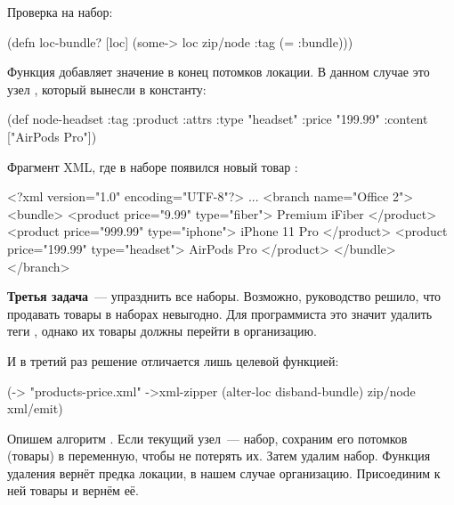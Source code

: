 Проверка на набор:

\begin{english}
  \begin{clojure}
(defn loc-bundle? [loc]
  (some-> loc zip/node :tag (= :bundle)))
  \end{clojure}
\end{english}

Функция  добавляет значение в конец потомков локации. В данном
случае это узел , который вынесли в константу:

\begin{english}
  \begin{clojure}
(def node-headset
  {:tag :product
   :attrs {:type "headset"
           :price "199.99"}
   :content ["AirPods Pro"]})
  \end{clojure}
\end{english}

Фрагмент XML, где в наборе появился новый товар :

\begin{english}
  \begin{xml/lines}
<?xml version="1.0" encoding="UTF-8"?>
...
  <branch name="Office 2">
    <bundle>
      <product price="9.99" type="fiber">
        Premium iFiber
      </product>
      <product price="999.99" type="iphone">
        iPhone 11 Pro
      </product>
      <product price="199.99" type="headset">
        AirPods Pro
      </product>
    </bundle>
  </branch>
  \end{xml/lines}
\end{english}

\textbf{Третья задача}~--- упразднить все наборы. Возможно, руководство решило,
что продавать товары в наборах невыгодно. Для программиста это значит удалить
теги , однако их товары должны перейти в организацию.

И в третий раз решение отличается лишь целевой функцией:

\begin{english}
  \begin{clojure}
(-> "products-price.xml"
    ->xml-zipper
    (alter-loc disband-bundle)
    zip/node
    xml/emit)
  \end{clojure}
\end{english}

Опишем алгоритм . Если текущий узел~--- набор, сохраним его
потомков (товары) в переменную, чтобы не потерять их. Затем удалим
набор. Функция удаления вернёт предка локации, в нашем случае
организацию. Присоединим к ней товары и вернём её.


